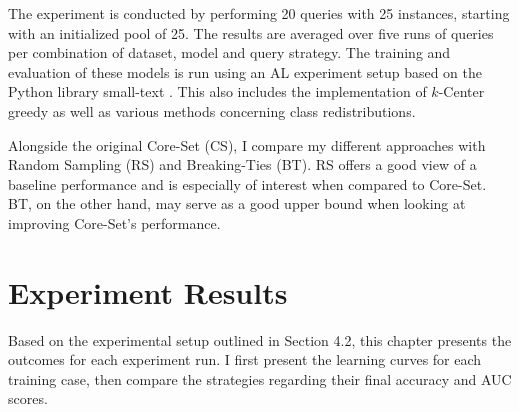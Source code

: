 \documentclass[english,bachelor,ul]{webisthesis} %
\begin{document}
The experiment is conducted by performing 20 queries with 25 instances, starting with an initialized pool of 25. The results are averaged over five runs of queries per combination of dataset, model and query strategy. The training and evaluation of these models is run using an AL experiment setup based on the Python library small-text \citep{schroeder2023small-text}. This also includes the implementation of $k$-Center greedy as well as various methods concerning class redistributions.

Alongside the original Core-Set (CS), I compare my different approaches with Random Sampling (RS) and Breaking-Ties (BT). RS offers a good view of a baseline performance and is especially of interest when compared to Core-Set. BT, on the other hand, may serve as a good upper bound when looking at improving Core-Set's performance.

\section{Experiment Results}

Based on the experimental setup outlined in Section 4.2, this chapter presents the outcomes for each experiment run. I first present the learning curves for each training case, then compare the strategies regarding their final accuracy and AUC scores.
\end{document}
